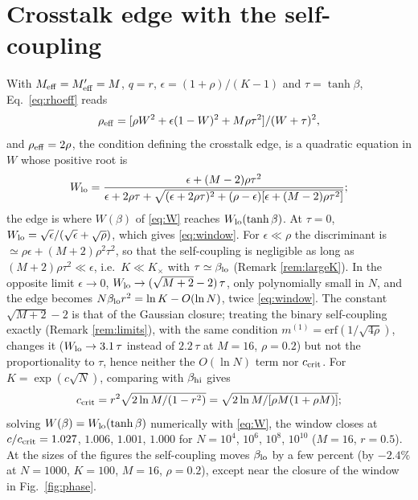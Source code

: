 \documentclass[11pt,a4paper]{article}
\newcommand{\Meff}{M_{\rm eff}}
\newcommand{\erf}{\mathrm{erf}}
\begin{document}
\section{Crosstalk edge with the self-coupling}
With $\Meff=\Meff'=M$, $q=r$, $\epsilon=(1+\rho)/(K-1)$ and $\tau=\tanh\beta$, Eq.\ \eqref{eq:rhoeff} reads
\begin{equation*}
\rho_{\rm eff}=[\rho W^2+\epsilon(1-W)^2+M\rho\tau^2]/(W+\tau)^2,
\end{equation*}
and $\rho_{\rm eff}=2\rho$, the condition defining the crosstalk edge, is a quadratic equation in $W$ whose positive root is
\begin{equation*}
W_{\rm lo}=\frac{\epsilon+(M-2)\rho\tau^2}{\epsilon+2\rho\tau+\sqrt{(\epsilon+2\rho\tau)^2+(\rho-\epsilon)[\epsilon+(M-2)\rho\tau^2]}};
\end{equation*}
the edge is where $W(\beta)$ of \eqref{eq:W} reaches $W_{\rm lo}(\tanh\beta)$. At $\tau=0$, $W_{\rm lo}=\sqrt\epsilon/(\sqrt\epsilon+\sqrt\rho)$, which gives \eqref{eq:window}. For $\epsilon\ll\rho$ the discriminant is $\simeq\rho\epsilon+(M+2)\rho^2\tau^2$, so that the self-coupling is negligible as long as $(M+2)\rho\tau^2\ll\epsilon$, i.e.\ $K\ll K_\times$ with $\tau\simeq\beta_{\rm lo}$ (Remark \ref{rem:largeK}). In the opposite limit $\epsilon\to0$, $W_{\rm lo}\to(\sqrt{M+2}-2)\,\tau$, only polynomially small in $N$, and the edge becomes $N\beta_{\rm lo}r^2=\ln K-O(\ln N)$, twice \eqref{eq:window}. The constant $\sqrt{M+2}-2$ is that of the Gaussian closure; treating the binary self-coupling exactly (Remark \ref{rem:limits}), with the same condition $m^{(1)}=\erf(1/\sqrt{4\rho})$, changes it ($W_{\rm lo}\to3.1\,\tau$ instead of $2.2\,\tau$ at $M=16$, $\rho=0.2$) but not the proportionality to $\tau$, hence neither the $O(\ln N)$ term nor $c_{\rm crit}$. For $K=\exp(c\sqrt N)$, comparing with $\beta_{\rm hi}$ gives
\begin{equation*}
c_{\rm crit}=r^2\sqrt{2\ln M/(1-r^2)}=\sqrt{2\ln M/[\rho M(1+\rho M)]};
\end{equation*}
solving $W(\beta)=W_{\rm lo}(\tanh\beta)$ numerically with \eqref{eq:W}, the window closes at $c/c_{\rm crit}=1.027$, $1.006$, $1.001$, $1.000$ for $N=10^4$, $10^6$, $10^8$, $10^{10}$ ($M=16$, $r=0.5$). At the sizes of the figures the self-coupling moves $\beta_{\rm lo}$ by a few percent (by $-2.4\%$ at $N=1000$, $K=100$, $M=16$, $\rho=0.2$), except near the closure of the window in Fig.\ \ref{fig:phase}.
\end{document}
